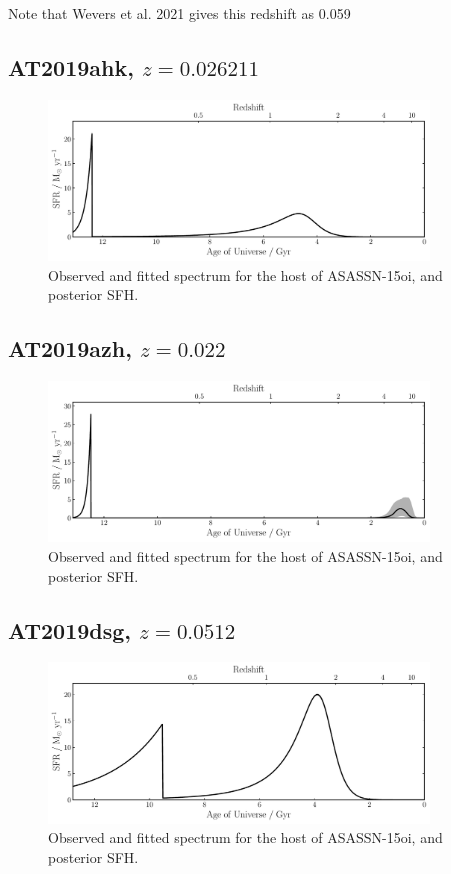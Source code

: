 \documentclass[a4paper,11pt]{article}
\begin{document}
Note that Wevers et al. 2021 gives this redshift as 0.059

\newpage
\subsection{AT2019ahk, $z=0.026211$}\label{sec:AT2019ahk}
\begin{figure}[h!]
\centering
  \includegraphics[width=0.9\textwidth]{../pipes/plots/r4_dblplaw_burst/AT2019ahk_sfh.pdf}
  \caption{Observed and fitted spectrum for the host of ASASSN-15oi, and posterior SFH.}
  \label{}
\end{figure}


\newpage
\subsection{AT2019azh, $z=0.022$}\label{sec:AT2019azh}
\begin{figure}[h!]
\centering
  \includegraphics[width=0.9\textwidth]{../pipes/plots/r4_dblplaw_burst/AT2019azh_sfh.pdf}
  \caption{Observed and fitted spectrum for the host of ASASSN-15oi, and posterior SFH.}
  \label{}
\end{figure}


\newpage
\subsection{AT2019dsg, $z=0.0512$}\label{sec:AT2019dsg}
\begin{figure}[h!]
\centering
  \includegraphics[width=0.9\textwidth]{../pipes/plots/r4_dblplaw_burst/AT2019dsg_sfh.pdf}
  \caption{Observed and fitted spectrum for the host of ASASSN-15oi, and posterior SFH.}
  \label{}
\end{figure}
\end{document}
